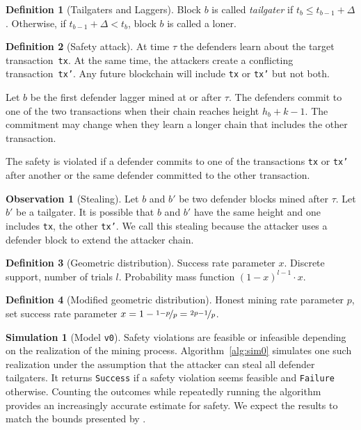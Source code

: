 \documentclass[12pt]{article}
\theoremstyle{definition}
\newtheorem{definition}{Definition}
\newtheorem{observation}{Observation}
\newtheorem{simulation}{Simulation}
\begin{document}
\begin{definition}[Tailgaters and Laggers]
  Block $b$ is called \emph{tailgater} if $t_b \leq t_{b-1} + \Delta$.
  Otherwise, if  $t_{b-1} + \Delta < t_b$, block $b$ is called a loner.
\end{definition}

\begin{definition}[Safety attack] \label{def:safety}
  At time $\tau$ the defenders learn about the target transaction~\texttt{tx}.
  At the same time, the attackers create a conflicting transaction~\texttt{tx'}.
  Any future blockchain will include \texttt{tx} or \texttt{tx'} but not both.

  Let $b$ be the first defender lagger mined at or after $\tau$.
  The defenders commit to one of the two transactions when their chain reaches height $h_b + k - 1$.
  The commitment may change when they learn a longer chain that includes the other transaction.

  The safety is violated if a defender commits to one of the transactions \texttt{tx} or \texttt{tx'} after another or the same defender committed to the other transaction.
\end{definition}

\begin{observation}[Stealing]
  Let $b$ and $b'$ be two defender blocks mined after $\tau$.
  Let $b'$ be a tailgater.
  It is possible that $b$ and $b'$ have the same height and one includes \texttt{tx}, the other \texttt{tx'}.
  We call this stealing because the attacker uses a defender block to extend the attacker chain.
\end{observation}

\begin{definition}[Geometric distribution]
  Success rate parameter $x$. Discrete support, number of trials $l$. Probability mass function $(1-x)^{l-1} \cdot x$.
\end{definition}

\begin{definition}[Modified geometric distribution] \label{def:modgeom}
  Honest mining rate parameter $p$, set success rate parameter $x = 1 - \nicefrac{1-p}p = \nicefrac{2p-1}p$.
\end{definition}

\begin{simulation}[Model \texttt{v0}] \label{sim:v0}
  Safety violations are feasible or infeasible depending on the realization of the mining process.
  Algorithm~\ref{alg:sim0} simulates one such realization under the assumption that the attacker can steal all defender tailgaters.
  It returns \texttt{Success} if a safety violation seems feasible and \texttt{Failure} otherwise.
  Counting the outcomes while repeatedly running the algorithm provides an increasingly accurate estimate for safety.
  We expect the results to match the bounds presented by \citet{guo2022BitcoinLatency}.
\end{simulation}
\end{document}

